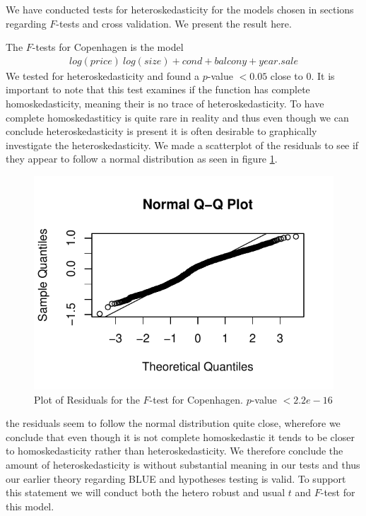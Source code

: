 We have conducted tests for heteroskedasticity for the models chosen in sections regarding $F$-tests and cross validation. We present the result here. 

The $F$-tests for Copenhagen is the model 
\begin{align*}
    log(price) ~ log(size) + cond + balcony + year.sale
\end{align*}
We tested for heteroskedasticity and found a $p$-value $< 0.05$ close to $0$. 
It is important to note that this test examines if the function has complete homoskedasticity, meaning their is no trace of heteroskedasticity. To have complete homoskedastiticy is quite rare in reality and thus even though we can conclude heteroskedasticity is present it is often desirable to graphically investigate the heteroskedasticity. 
We made a scatterplot of the residuals to see if they appear to follow a normal distribution as seen in figure \ref{fig:F_chp_resu}. 


\begin{figure}[H]
        \centering
      \includegraphics[width = 1 \textwidth]{figures/QQNORMDENHER.pdf}
      \caption{Plot of Residuals for the $F$-test for Copenhagen. $p$-value $< 2.2e-16$}
      \label{fig:F_chp_resu}
\end{figure}
 
the residuals seem to follow the normal distribution quite close, wherefore we conclude that even though it is not complete homoskedastic it tends to be closer to homoskedasticity rather than heteroskedasticity. 
We therefore conclude the amount of heteroskedasticity is without substantial meaning in our tests and thus our earlier theory regarding BLUE and hypotheses testing is valid. To support this statement we will conduct both the hetero robust and usual $t$ and $F$-test for this model.



